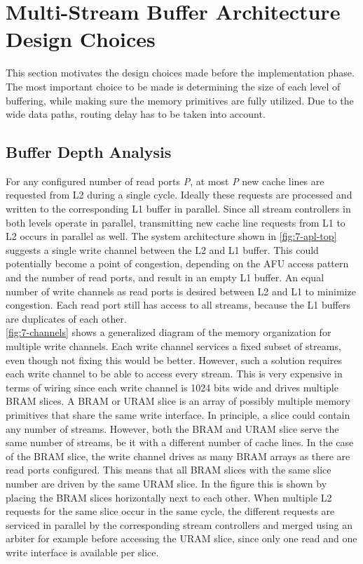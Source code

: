 \section{Multi-Stream Buffer Architecture Design Choices}
\label{sec:design-choice}
This section motivates the design choices made before the implementation phase. The most important choice to be made is determining the size of each level of buffering, while making sure the memory primitives are fully utilized. Due to the wide data paths, routing delay has to be taken into account.



\subsection{Buffer Depth Analysis}
\label{sec:buffer-depth}
For any configured number of read ports \textit{P}, at most \textit{P} new cache lines are requested from L2 during a single cycle. Ideally these requests are processed and written to the corresponding L1 buffer in parallel. Since all stream controllers in both levels operate in parallel, transmitting new cache line requests from L1 to L2 occurs in parallel as well. The system architecture shown in \autoref{fig:7-apl-top} suggests a single write channel between the L2 and L1 buffer. This could potentially become a point of congestion, depending on the AFU access pattern and the number of read ports, and result in an empty L1 buffer. An equal number of write channels as read ports is desired between L2 and L1 to minimize congestion. Each read port still has access to all streams, because the L1 buffers are duplicates of each other.\\
\autoref{fig:7-channels} shows a generalized diagram of the memory organization for multiple write channels. Each write channel services a fixed subset of streams, even though not fixing this would be better. However, such a solution requires each write channel to be able to access every stream. This is very expensive in terms of wiring since each write channel is 1024 bits wide and drives multiple BRAM slices. A BRAM or URAM slice is an array of possibly multiple memory primitives that share the same write interface. In principle, a slice could contain any number of streams. However, both the BRAM and URAM slice serve the same number of streams, be it with a different number of cache lines. In the case of the BRAM slice, the write channel drives as many BRAM arrays as there are read ports configured. This means that all BRAM slices with the same slice number are driven by the same URAM slice. In the figure this is shown by placing the BRAM slices horizontally next to each other. When multiple L2 requests for the same slice occur in the same cycle, the different requests are serviced in parallel by the corresponding stream controllers and merged using an arbiter for example before accessing the URAM slice, since only one read and one write interface is available per slice.

